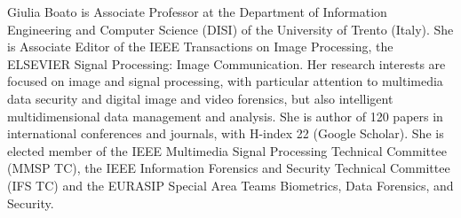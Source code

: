 \documentclass{ieeeaccess}
\begin{document}

\begin{IEEEbiography}{Giulia Boato} is Associate Professor at the Department of Information Engineering and Computer Science (DISI) of the University of Trento (Italy). She is Associate Editor of the IEEE Transactions on Image Processing, the ELSEVIER Signal Processing: Image Communication. Her research interests are focused on image and signal processing, with particular attention to multimedia data security and digital image and video forensics, but also intelligent multidimensional data management and analysis. She is author of 120 papers in international conferences and journals, with H-index 22 (Google Scholar). She is elected member of the IEEE Multimedia Signal Processing Technical Committee (MMSP TC), the IEEE Information Forensics and Security Technical Committee (IFS TC) and the EURASIP Special Area Teams Biometrics, Data Forensics, and Security.
\end{IEEEbiography}
\end{document}
